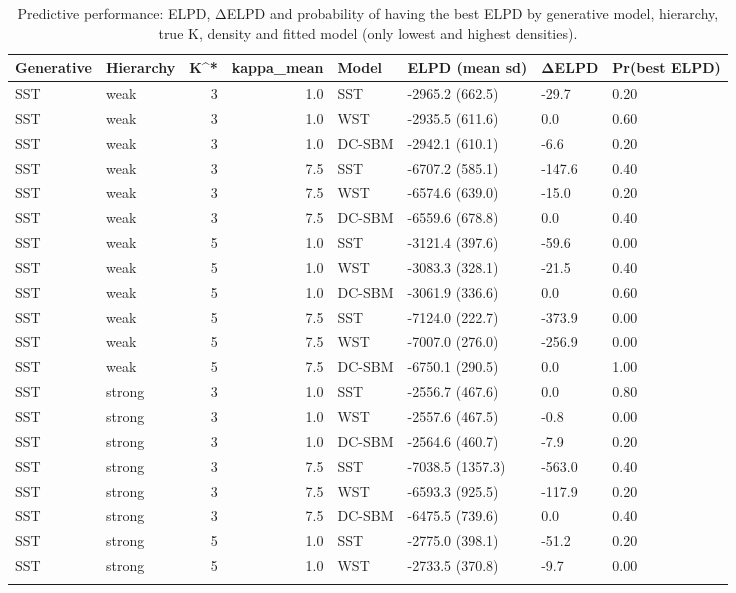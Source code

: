 \begin{table}
\centering
\caption{Predictive performance: ELPD, ΔELPD and probability of having the best ELPD by generative model, hierarchy, true K, density and fitted model (only lowest and highest densities).}
\centering
\begin{tabular}[t]{llrrllll}
\toprule
Generative & Hierarchy & K^* & kappa_mean & Model & ELPD (mean sd) & ΔELPD & Pr(best ELPD)\\
\midrule
SST & weak & 3 & 1.0 & SST & -2965.2 (662.5) & -29.7 & 0.20\\
SST & weak & 3 & 1.0 & WST & -2935.5 (611.6) & 0.0 & 0.60\\
SST & weak & 3 & 1.0 & DC-SBM & -2942.1 (610.1) & -6.6 & 0.20\\
SST & weak & 3 & 7.5 & SST & -6707.2 (585.1) & -147.6 & 0.40\\
SST & weak & 3 & 7.5 & WST & -6574.6 (639.0) & -15.0 & 0.20\\
\addlinespace
SST & weak & 3 & 7.5 & DC-SBM & -6559.6 (678.8) & 0.0 & 0.40\\
SST & weak & 5 & 1.0 & SST & -3121.4 (397.6) & -59.6 & 0.00\\
SST & weak & 5 & 1.0 & WST & -3083.3 (328.1) & -21.5 & 0.40\\
SST & weak & 5 & 1.0 & DC-SBM & -3061.9 (336.6) & 0.0 & 0.60\\
SST & weak & 5 & 7.5 & SST & -7124.0 (222.7) & -373.9 & 0.00\\
\addlinespace
SST & weak & 5 & 7.5 & WST & -7007.0 (276.0) & -256.9 & 0.00\\
SST & weak & 5 & 7.5 & DC-SBM & -6750.1 (290.5) & 0.0 & 1.00\\
SST & strong & 3 & 1.0 & SST & -2556.7 (467.6) & 0.0 & 0.80\\
SST & strong & 3 & 1.0 & WST & -2557.6 (467.5) & -0.8 & 0.00\\
SST & strong & 3 & 1.0 & DC-SBM & -2564.6 (460.7) & -7.9 & 0.20\\
\addlinespace
SST & strong & 3 & 7.5 & SST & -7038.5 (1357.3) & -563.0 & 0.40\\
SST & strong & 3 & 7.5 & WST & -6593.3 (925.5) & -117.9 & 0.20\\
SST & strong & 3 & 7.5 & DC-SBM & -6475.5 (739.6) & 0.0 & 0.40\\
SST & strong & 5 & 1.0 & SST & -2775.0 (398.1) & -51.2 & 0.20\\
SST & strong & 5 & 1.0 & WST & -2733.5 (370.8) & -9.7 & 0.00\\
\addlinespace

\end{tabular}
\end{table}
